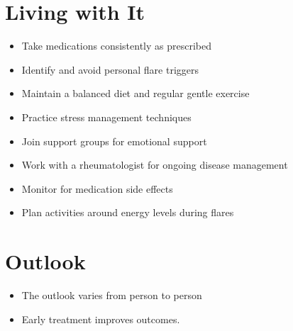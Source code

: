 \section{Living with It}
\begin{itemize}[noitemsep]
  \item Take medications consistently as prescribed
  \item Identify and avoid personal flare triggers
  \item Maintain a balanced diet and regular gentle exercise
  \item Practice stress management techniques
  \item Join support groups for emotional support
  \item Work with a rheumatologist for ongoing disease management
  \item Monitor for medication side effects
  \item Plan activities around energy levels during flares
\end{itemize}
\section{Outlook}
\begin{itemize}[noitemsep]
  \item The outlook varies from person to person
  \item Early treatment improves outcomes.
\end{itemize}
